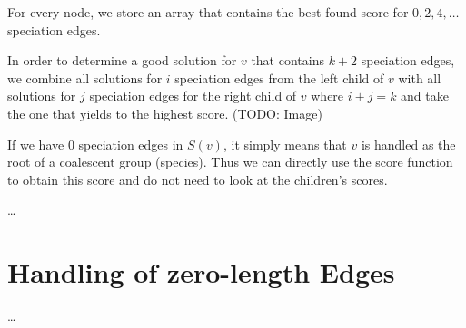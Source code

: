 \documentclass{llncs}
\begin{document}
For every node, we store an array that contains the best found score for $0, 2, 4, \ldots$ speciation edges.

In order to determine a good solution for $v$ that contains $k+2$ speciation edges, we combine all solutions for $i$ speciation edges from the left child of $v$ with all solutions for $j$ speciation edges for the right child of $v$ where $i+j=k$ and take the one that yields to the highest score. (TODO: Image)

If we have $0$ speciation edges in $S(v)$, it simply means that $v$ is handled as the root of a coalescent group (species). Thus we can directly use the score function to obtain this score and do not need to look at the children's scores.

\ldots

\section{Handling of zero-length Edges}

\ldots



\end{document}

